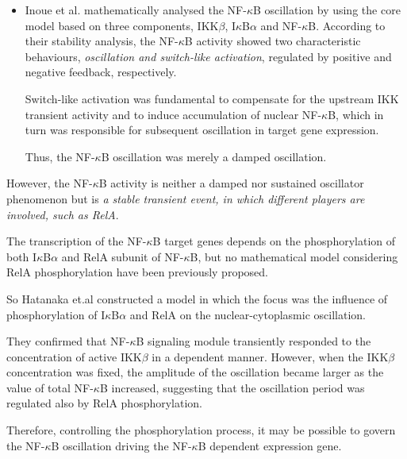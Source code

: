 \documentclass[12pt,a4paper]{report}
\begin{document}
\begin{itemize}
 \item Inoue et al. mathematically analysed the NF-$\kappa$B oscillation by using the core model based on three components, IKK$\beta$, I$\kappa$B$\alpha$ and NF-$\kappa$B. According to their stability analysis, the NF-$\kappa$B activity showed two characteristic behaviours, \emph{oscillation and switch-like activation}, regulated by positive and negative feedback, respectively.
 
 Switch-like activation was fundamental to compensate for the upstream IKK transient activity and to induce accumulation of nuclear NF-$\kappa$B, which in turn was responsible for subsequent oscillation in target gene expression. %
 
 Thus, the NF-$\kappa$B oscillation was merely a damped oscillation.

\end{itemize}

However, the NF-$\kappa$B activity is neither a damped nor sustained oscillator phenomenon but is \emph{a stable transient event, in which different players are involved, such as RelA}.

The transcription of the NF-$\kappa$B target genes depends on the phosphorylation of both I$\kappa$B$\alpha$ and RelA subunit of NF-$\kappa$B, but no mathematical model considering RelA phosphorylation have been previously proposed.

So Hatanaka et.al constructed a model in which the focus was the influence of phosphorylation
of I$\kappa$B$\alpha$ and RelA on the nuclear-cytoplasmic oscillation.

They confirmed that NF-$\kappa$B signaling module transiently responded to the concentration of active IKK$\beta$ in a dependent manner. However, when the IKK$\beta$ concentration was fixed, the amplitude of the oscillation became larger as the value of total NF-$\kappa$B increased, suggesting that the oscillation period was regulated also by RelA phosphorylation.%

Therefore, controlling the phosphorylation
process, it may be possible to govern the NF-$\kappa$B oscillation driving the NF-$\kappa$B dependent expression gene.
\end{document}

